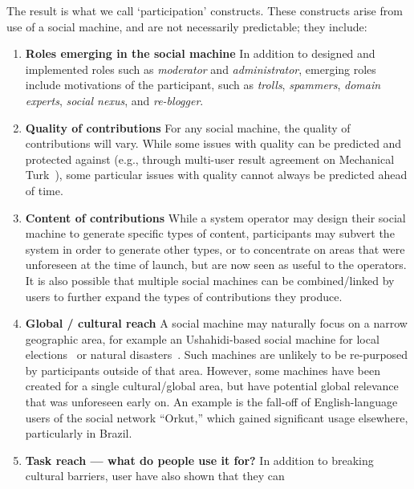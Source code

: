 \documentclass{sig-alternate}
\begin{document}
The result is what we call `participation' constructs. These constructs arise from use of a
social machine, and are not necessarily predictable; they include:

\begin{enumerate}
\item {\bf Roles emerging in the social machine}
   \newline In addition to designed and implemented roles such as {\it moderator} and {\it administrator}, emerging roles include motivations of the participant, such as {\it trolls}, {\it spammers}, {\it domain experts}, {\it social nexus}, and {\it re-blogger}.
\item {\bf Quality of contributions}
    \newline For any social machine, the quality of contributions will vary. While some
    issues with quality can be predicted and protected against (e.g., through
    multi-user result agreement on Mechanical Turk~\cite{ipeirotis2010quality}), some
    particular issues with quality cannot always be predicted ahead of time.
\item {\bf Content of contributions}
    \newline While a system operator may design their social machine to generate specific
    types of content, participants may subvert the system in order to generate other types,
    or to concentrate on areas that were unforeseen at the time of launch, but are now seen
    as useful to the operators. It is also possible that multiple social machines can be
    combined/linked by users to further expand the types of contributions they produce.
\item {\bf Global / cultural reach}
    \newline A social machine may naturally focus on a narrow geographic area, for example
    an Ushahidi-based social machine for local elections~\cite{meier2008crisis} or
    natural disasters~\cite{morrow2011independent}. Such machines are unlikely to be
    re-purposed by participants outside of that area. However, some machines have been
    created for a single cultural/global area, but have potential global relevance that was
    unforeseen early on. An example is the fall-off of English-language users of the
    social network ``Orkut,'' which gained significant usage elsewhere, particularly in
    Brazil.
\item {\bf Task reach --- what do people use it for?}
    \newline In addition to breaking cultural barriers, user have also shown that they can

\end{enumerate}
\end{document}
